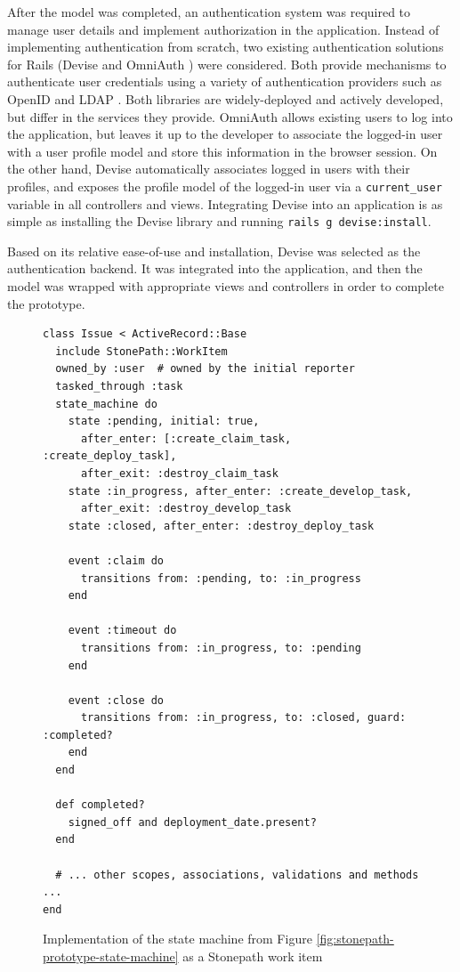 \documentclass[document.tex]{subfiles}
\begin{document}
After the model was completed, an authentication system was required to manage user details and implement authorization in the application. Instead of implementing authentication from scratch, two existing authentication solutions for Rails (Devise \cite{devise} and OmniAuth \cite{omniauth}) were considered. Both provide mechanisms to authenticate user credentials using a variety of authentication providers such as OpenID \cite{devise-openid} and LDAP \cite{omniauth-ldap}. Both libraries are widely-deployed and actively developed, but differ in the services they provide. OmniAuth allows existing users to log into the application, but leaves it up to the developer to associate the logged-in user with a user profile model and store this information in the browser session. On the other hand, Devise automatically associates logged in users with their profiles, and exposes the profile model of the logged-in user via a \verb!current_user! variable in all controllers and views. Integrating Devise into an application is as simple as installing the Devise library and running {\tt rails g devise:install}.

Based on its relative ease-of-use and installation, Devise was selected as the authentication backend. It was integrated into the application, and then the model was wrapped with appropriate views and controllers in order to complete the prototype.

\begin{figure}[!ht]
  \begin{lstlisting}
class Issue < ActiveRecord::Base
  include StonePath::WorkItem
  owned_by :user  # owned by the initial reporter
  tasked_through :task
  state_machine do
    state :pending, initial: true,
      after_enter: [:create_claim_task, :create_deploy_task],
      after_exit: :destroy_claim_task
    state :in_progress, after_enter: :create_develop_task,
      after_exit: :destroy_develop_task
    state :closed, after_enter: :destroy_deploy_task

    event :claim do
      transitions from: :pending, to: :in_progress
    end

    event :timeout do
      transitions from: :in_progress, to: :pending
    end

    event :close do
      transitions from: :in_progress, to: :closed, guard: :completed?
    end
  end

  def completed?
    signed_off and deployment_date.present?
  end

  # ... other scopes, associations, validations and methods ...
end
  \end{lstlisting}
  \caption{Implementation of the state machine from Figure \ref{fig:stonepath-prototype-state-machine} as a Stonepath work item}
  \label{fig:stonepath-prototype-workitem}
\end{figure}
\end{document}

